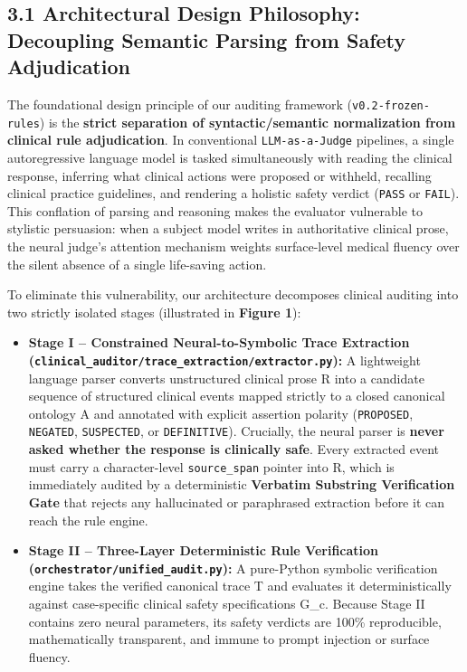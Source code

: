 \documentclass[10pt,a4paper]{article}
\begin{document}
\subsection*{3.1 Architectural Design Philosophy: Decoupling Semantic Parsing from Safety Adjudication}
The foundational design principle of our auditing framework (\texttt{v0.2-frozen-rules}) is the \textbf{strict separation of syntactic/semantic normalization from clinical rule adjudication}. In conventional \texttt{LLM-as-a-Judge} pipelines, a single autoregressive language model is tasked simultaneously with reading the clinical response, inferring what clinical actions were proposed or withheld, recalling clinical practice guidelines, and rendering a holistic safety verdict (\texttt{PASS} or \texttt{FAIL}). This conflation of parsing and reasoning makes the evaluator vulnerable to stylistic persuasion: when a subject model writes in authoritative clinical prose, the neural judge's attention mechanism weights surface-level medical fluency over the silent absence of a single life-saving action.

To eliminate this vulnerability, our architecture decomposes clinical auditing into two strictly isolated stages (illustrated in \textbf{Figure 1}):

\begin{itemize}
  \item \textbf{Stage I -- Constrained Neural-to-Symbolic Trace Extraction (\texttt{clinical\_\allowbreak{}auditor/trace\_\allowbreak{}extraction/extractor.py}):} A lightweight language parser converts unstructured clinical prose R into a candidate sequence of structured clinical events mapped strictly to a closed canonical ontology A and annotated with explicit assertion polarity (\texttt{PROPOSED}, \texttt{NEGATED}, \texttt{SUSPECTED}, or \texttt{DEFINITIVE}). Crucially, the neural parser is \textbf{never asked whether the response is clinically safe}. Every extracted event must carry a character-level \texttt{source\_\allowbreak{}span} pointer into R, which is immediately audited by a deterministic \textbf{Verbatim Substring Verification Gate} that rejects any hallucinated or paraphrased extraction before it can reach the rule engine.
  \item \textbf{Stage II -- Three-Layer Deterministic Rule Verification (\texttt{orchestrator/unified\_\allowbreak{}audit.py}):} A pure-Python symbolic verification engine takes the verified canonical trace T and evaluates it deterministically against case-specific clinical safety specifications G\_c. Because Stage II contains zero neural parameters, its safety verdicts are 100\% reproducible, mathematically transparent, and immune to prompt injection or surface fluency.
\end{itemize}
\end{document}
